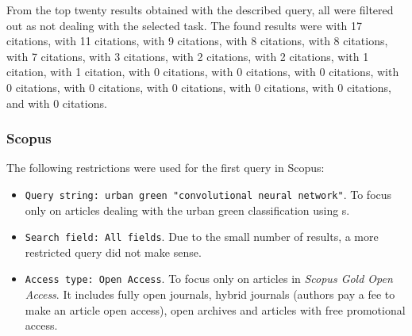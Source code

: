 \noindent From the top twenty results obtained with the described query, all were filtered out as not dealing with the selected task. The found results were \cite{dl-rs-built-up-areas} with 17 citations, \cite{dl-bird-detection} with 11 citations, \cite{dnn-iot} with 9 citations, \cite{dl-sl-wetland} with 8 citations, \cite{dl-corneal-epithelium} with 8 citations, \cite{dl-age-estimation} with 7 citations, \cite{cnn-parking-occupacy} with 3 citations, \cite{ground-measurement-forest} with 2 citations, \cite{bike-sharing-destination} with 2 citations, \cite{w-net-lc} with 1 citation, \cite{mimo-fmcw-parking} with 1 citation, \cite{urban-green-obesity} with 0 citations, \cite{robust-parking-surveillance} with 0 citations, \cite{social-media-open-space} with 0 citations, \cite{dcnn-parking-detection} with 0 citations, \cite{review-crowd-monitoring} with 0 citations, \cite{dl-galapagos-snake} with 0 citations, \cite{deep-binary-vehicle} with 0 citations, \cite{cnn-parrots} with 0 citations, and \cite{indoor-positioning-error} with 0 citations.

\subsubsection{Scopus}
\label{urban-green-scopus}

The following restrictions were used for the first query in Scopus:

\begin{itemize}
	\item \verb|Query string: urban green "convolutional neural network"|. To fo\-cus on\-ly on articles dealing with the urban green classification using s.
	\item \verb|Search field: All fields|. Due to the small number of results, a more restricted query did not make sense.
	\item \verb|Access type: Open Access|. To focus only on articles in \textit{Scopus Gold Open Access}. It includes fully open journals, hybrid journals (authors pay a fee to make an article open access), open archives and articles with free promotional access.
\end{itemize}

